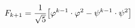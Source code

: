 \documentclass[preview]{standalone}
\begin{document}
\begin{align*}
\special{dvisvgm:raw <g id='unique000'>}F_{k+1} = \frac{1}{\sqrt{5}}\big[\varphi^{k-1} \cdot \varphi^2- \psi^{k-1} \cdot \psi^2\big]\special{dvisvgm:raw </g>}
\end{align*}
\end{document}
